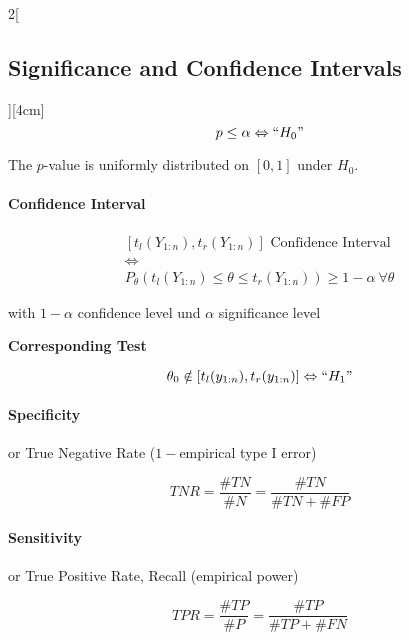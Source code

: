 \documentclass[8pt]{extarticle}
\begin{document}
\begin{multicols}{2}[\subsection{Significance and Confidence Intervals}][4cm]
$$p\leq \alpha \Leftrightarrow ``H_0"$$

\noindent The $p$-value is uniformly distributed on $[0,1]$ under $H_0$.




\paragraph{Confidence Interval}
$$\begin{gathered}
\left[t_l(Y_{1:n}),t_r(Y_{1:n})\right] \text{ Confidence Interval } \\
\Leftrightarrow \\
P_\theta\left(t_l(Y_{1:n}) {\leq} \theta {\leq} t_r(Y_{1:n})\right) \geq 1{-}\alpha \:\forall \theta
\end{gathered} $$


\noindent with $1-\alpha$ confidence level und $\alpha$ significance level
\vspace{0.5em}

\textbf{Corresponding Test}

$$\theta_0 \notin \left[t_l(y_{1:n}), t_r(y_{1:n})\right] \Leftrightarrow ``H_1"$$



\paragraph{Specificity}  or True Negative Rate ($1 -$empirical type I error)

$$TNR = \frac{\#TN}{\#N} = \frac{\#TN}{\#TN + \#FP}$$

\paragraph{Sensitivity}  or True Positive Rate, Recall (empirical power)

$$TPR = \frac{\#TP}{\#P} = \frac{\#TP}{\#TP + \#FN}$$

\end{multicols}
\end{document}
